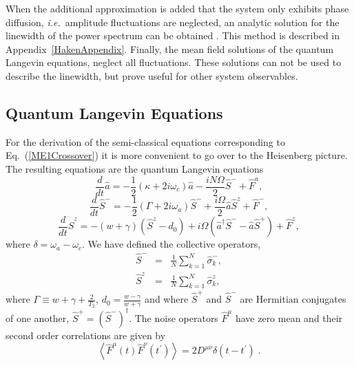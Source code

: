 \documentclass[aps,
twocolumn,
superscriptaddress,groupedaddress]{revtex4}
\begin{document}
When the additional approximation is added that the system only exhibits phase diffusion, {\em i.e.}\ amplitude fluctuations are neglected, an analytic solution for the linewidth of the power spectrum can be obtained \cite{HakenLaser, HakenLaserBook}. This method is described in Appendix~\ref{HakenAppendix}.
Finally, the mean field solutions of the quantum Langevin equations, neglect all fluctuations. These solutions 
can not be used to describe the linewidth, but prove useful for other system observables.

\fi

\subsection{Quantum Langevin Equations}

For the derivation of the semi-classical equations corresponding to 
Eq.~(\ref{ME1Crossover}) it is more convenient to go over to the
Heisenberg picture.  The resulting equations are the quantum Langevin
equations
\begin{equation}
\frac{d}{dt} \hat{a}= -\frac{1}{2} (\kappa +2i\omega_c) \hat{a}
-\frac{i N \Omega}{2} \hat{S}^{-}
+\hat{F}^{a},
\label{La}
\end{equation}
\begin{equation}
\frac{d}{dt} \hat{S}^{-} =
-\frac{1}{2} \left(\Gamma +2 i \omega_a \right)  \hat{S}^{-}
+\frac{i \Omega}{2} \hat{a} \hat{S}^{z}
+\hat{F}^{-},
\label{Lsm}
\end{equation}
\begin{equation}
\frac{d}{dt} \hat{S}^{z} =
-(w+\gamma)\left( \hat{S}^{z} - d_0\right)
+i\Omega \left( \hat{a}^{\dagger}\hat{S}^{-} -
\hat{a}\hat{S}^{+} \right)
+\hat{F}^{z},
\label{Lsz}
\end{equation}
where $\delta=\omega_{a}-\omega_{c}$. We have defined the collective
operators,
\begin{eqnarray}
\hat{S}^{-}&=&\frac{1}{N}\sum_{k=1}^N \hat{\sigma}_k^{-},
\nonumber
\\
\hat{S}^{z}&=&\frac{1}{N}\sum_{k=1}^N \hat{\sigma}_k^{z},
\nonumber
\end{eqnarray}
where $\Gamma \equiv w+\gamma+\frac{2}{T_2}$, $d_0 =
\frac{w-\gamma}{w+\gamma}$ and where $\hat{S}^{+}$ and $\hat{S}^{-}$ are
Hermitian conjugates of one another, $\hat{S}^{+} =
(\hat{S}^{-})^{\dagger}$. The noise operators $\hat F^\mu$ have zero
mean and their second order correlations are given by
\begin{equation}
\left< \hat{F}^{\mu}(t) \hat{F}^{\nu}(t^{\prime})\right> =
2 D^{\mu \nu} \delta(t-t^{\prime})\;.
\end{equation}
\end{document}

